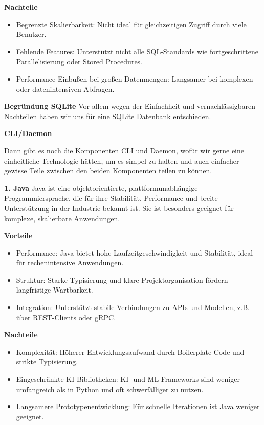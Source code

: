 \documentclass[a4paper,12pt]{report}
\begin{document}
    \textbf{Nachteile}
    \begin{itemize}
        \item Begrenzte Skalierbarkeit: Nicht ideal für gleichzeitigen Zugriff durch viele Benutzer.
        \item Fehlende Features: Unterstützt nicht alle SQL-Standards wie fortgeschrittene Parallelisierung oder Stored Procedures.
        \item Performance-Einbußen bei großen Datenmengen: Langsamer bei komplexen oder datenintensiven Abfragen.
    \end{itemize}

    \textbf{Begründung SQLite} Vor allem wegen der Einfachheit und vernachlässigbaren Nachteilen haben wir uns für eine
    SQLite Datenbank entschieden.

    {\large\bfseries CLI/Daemon}

    Dann gibt es noch die Komponenten CLI und Daemon, wofür wir gerne eine einheitliche Technologie hätten,
    um es simpel zu halten und auch einfacher gewisse Teile zwischen den beiden Komponenten teilen zu können.

    \textbf{1. Java}
    Java ist eine objektorientierte, plattformunabhängige Programmiersprache,
    die für ihre Stabilität, Performance und breite Unterstützung in der Industrie bekannt ist.
    Sie ist besonders geeignet für komplexe, skalierbare Anwendungen.

    \textbf{Vorteile}
    \begin{itemize}
        \item Performance: Java bietet hohe Laufzeitgeschwindigkeit und Stabilität, ideal für rechenintensive Anwendungen.
        \item Struktur: Starke Typisierung und klare Projektorganisation fördern langfristige Wartbarkeit.
        \item Integration: Unterstützt stabile Verbindungen zu APIs und Modellen, z.B. über REST-Clients oder gRPC.
    \end{itemize}

    \textbf{Nachteile}
    \begin{itemize}
        \item Komplexität: Höherer Entwicklungsaufwand durch Boilerplate-Code und strikte Typisierung.
        \item Eingeschränkte KI-Bibliotheken: KI- und ML-Frameworks sind weniger umfangreich als in Python und oft schwerfälliger zu nutzen.
        \item Langsamere Prototypenentwicklung: Für schnelle Iterationen ist Java weniger geeignet.
    \end{itemize}
\end{document}
